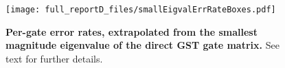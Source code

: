{\begin{figure}
\begin{center}
\texttt{[image: full\_reportD\_files/smallEigvalErrRateBoxes.pdf]}
\caption{\textbf{Per-gate error rates, extrapolated from the smallest magnitude eigenvalue of the direct GST gate matrix.}  See text for further details.\label{smallEvalErrRateBoxPlot}}
\end{center}
\end{figure}


}{}


